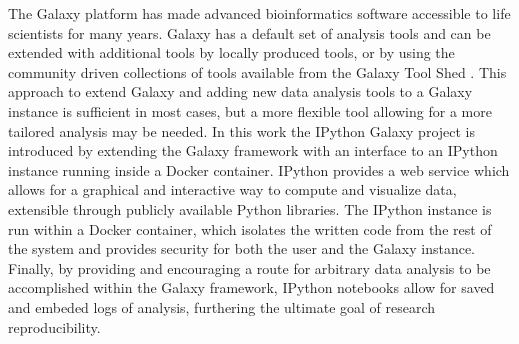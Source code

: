 \documentclass{bioinfo}
\begin{document}
The Galaxy platform \citep{Blank2010,Giardine2005,Goecks2010} has made advanced bioinformatics software accessible
to life scientists for many years. Galaxy has a default set of analysis tools and can be extended with additional
tools by locally produced tools, or by using the community driven collections of tools available from the Galaxy Tool Shed
\citep{Blankenber2014}. This approach to extend Galaxy and adding new data analysis tools to a Galaxy instance is sufficient
in most cases, but a more flexible tool allowing for a more tailored analysis may be needed.
In this work the IPython Galaxy project is introduced by extending the Galaxy framework with an interface to an
IPython \citep{Perez2007} instance running inside a Docker container.
IPython provides a web service which allows for a graphical and interactive way to compute and visualize data, 
extensible through publicly available Python libraries. The IPython instance is run within a Docker container, 
which isolates the written code from the rest of the system and provides security for both the user and the Galaxy instance. Finally, by providing and encouraging a route for arbitrary data analysis to be accomplished within the Galaxy framework, 
IPython notebooks allow for saved and embeded logs of analysis, furthering the ultimate goal of research reproducibility.
\end{document}
